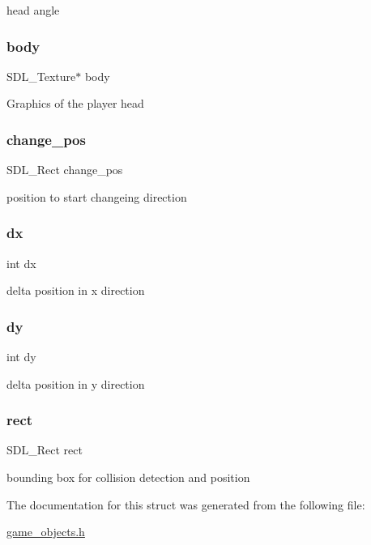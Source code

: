 head angle \mbox{\label{structbody__object_a78cbc3f4a306ce98ce51b731549a5cf0}} 
\subsubsection{\texorpdfstring{body}{body}}
{\footnotesize\ttfamily S\+D\+L\+\_\+\+Texture$\ast$ body}

Graphics of the player head \mbox{\label{structbody__object_a7abd7a5b88f5115b8c83092f283b8c83}} 
\subsubsection{\texorpdfstring{change\_pos}{change\_pos}}
{\footnotesize\ttfamily S\+D\+L\+\_\+\+Rect change\+\_\+pos}

position to start changeing direction \mbox{\label{structbody__object_a6a0d40b2ed6d9e674f93396212f0028f}} 
\subsubsection{\texorpdfstring{dx}{dx}}
{\footnotesize\ttfamily int dx}

delta position in x direction \mbox{\label{structbody__object_a4817151aee120cc100c400d3076f4b93}} 
\subsubsection{\texorpdfstring{dy}{dy}}
{\footnotesize\ttfamily int dy}

delta position in y direction \mbox{\label{structbody__object_a55aefd071649ac9dd8133e2d8a52d11f}} 
\subsubsection{\texorpdfstring{rect}{rect}}
{\footnotesize\ttfamily S\+D\+L\+\_\+\+Rect rect}

bounding box for collision detection and position 

The documentation for this struct was generated from the following file\+:\begin{DoxyCompactItemize}
\item 
\mbox{\hyperlink{game__objects_8h}{game\+\_\+objects.\+h}}\end{DoxyCompactItemize}
